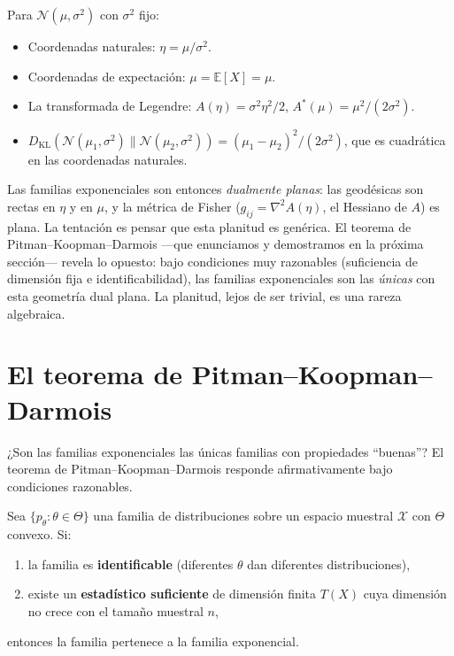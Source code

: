 \begin{example}
	Para $\mathcal{N}(\mu, \sigma^2)$ con $\sigma^2$ fijo:
	\begin{itemize}
		\item Coordenadas naturales: $\eta = \mu/\sigma^2$.
		\item Coordenadas de expectación: $\mu = \mathbb{E}[X] = \mu$.
		\item La transformada de Legendre: $A(\eta) = \sigma^2 \eta^2/2$, $A^*(\mu) = \mu^2/(2\sigma^2)$.\item $D_{\mathrm{KL}}(\mathcal{N}(\mu_1,\sigma^2) \| \mathcal{N}(\mu_2,\sigma^2)) = (\mu_1-\mu_2)^2/(2\sigma^2)$, que es cuadrática en las coordenadas naturales.
\end{itemize}
\end{example}

Las familias exponenciales son entonces \emph{dualmente planas}: las geodésicas son rectas en $\eta$ y en $\mu$, y la métrica de Fisher ($g_{ij}=\nabla^2 A(\eta)$, el Hessiano de $A$) es plana. La tentación es pensar que esta planitud es genérica. El teorema de Pitman--Koopman--Darmois ---que enunciamos y demostramos en la próxima sección--- revela lo opuesto: bajo condiciones muy razonables (suficiencia de dimensión fija e identificabilidad), las familias exponenciales son las \emph{únicas} con esta geometría dual plana. La planitud, lejos de ser trivial, es una rareza algebraica.

\section{El teorema de Pitman--Koopman--Darmois}

¿Son las familias exponenciales las únicas familias con propiedades ``buenas''?  El teorema de Pitman--Koopman--Darmois responde afirmativamente bajo condiciones razonables.

\begin{theorem}
	Sea $\{p_\theta : \theta \in \Theta\}$ una familia de distribuciones sobre un espacio muestral $\mathcal{X}$ con $\Theta$ convexo.  Si:
	\begin{enumerate}
		\item la familia es \textbf{identificable} (diferentes $\theta$ dan diferentes distribuciones),
		\item existe un \textbf{estadístico suficiente} de dimensión finita $T(X)$ cuya dimensión no crece con el tamaño muestral $n$,
	\end{enumerate}
	entonces la familia pertenece a la familia exponencial.
\end{theorem}

